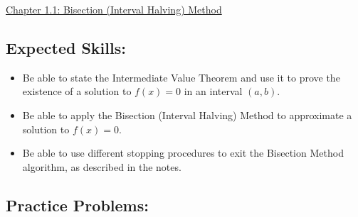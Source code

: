 \documentclass[12pt]{article}
\begin{document}
\begin{center}
\underline{\LARGE{Chapter 1.1: Bisection (Interval Halving) Method}}
\end{center}

\subsection*{Expected Skills:}

\begin{itemize}

\item Be able to state the Intermediate Value Theorem and use it to prove the existence of a solution to $f(x)=0$ in an interval $(a,b)$.

\item Be able to apply the Bisection (Interval Halving) Method to approximate a solution to $f(x)=0$.

\item Be able to use different stopping procedures to exit the Bisection Method algorithm, as described in the notes.

\end{itemize}

\subsection*{Practice Problems: }
\end{document}

